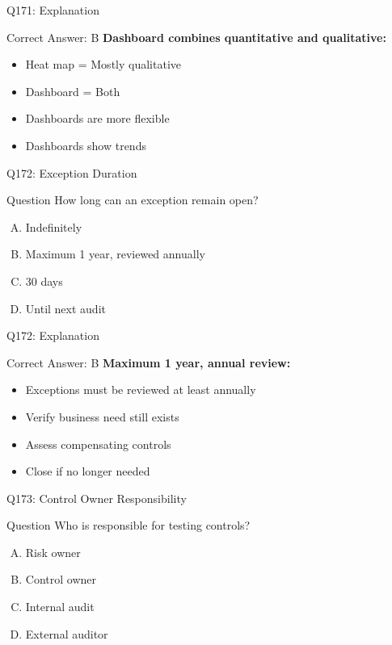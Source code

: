 \documentclass{beamer}
\begin{document}
	\begin{frame}{Q171: Explanation}
		\begin{block}{Correct Answer: B}
			\textbf{Dashboard combines quantitative and qualitative:}
			\begin{itemize}
				\item Heat map = Mostly qualitative
				\item Dashboard = Both
				\item Dashboards are more flexible
				\item Dashboards show trends
			\end{itemize}
		\end{block}
	\end{frame}
	
	\begin{frame}{Q172: Exception Duration}
		\begin{block}{Question}
			How long can an exception remain open?
		\end{block}
		\begin{enumerate}[(A)]
			\item Indefinitely
			\item Maximum 1 year, reviewed annually
			\item 30 days
			\item Until next audit
		\end{enumerate}
	\end{frame}
	
	\begin{frame}{Q172: Explanation}
		\begin{block}{Correct Answer: B}
			\textbf{Maximum 1 year, annual review:}
			\begin{itemize}
				\item Exceptions must be reviewed at least annually
				\item Verify business need still exists
				\item Assess compensating controls
				\item Close if no longer needed
			\end{itemize}
		\end{block}
	\end{frame}
	
	\begin{frame}{Q173: Control Owner Responsibility}
		\begin{block}{Question}
			Who is responsible for testing controls?
		\end{block}
		\begin{enumerate}[(A)]
			\item Risk owner
			\item Control owner
			\item Internal audit
			\item External auditor
		\end{enumerate}
	\end{frame}
	
\end{document}
